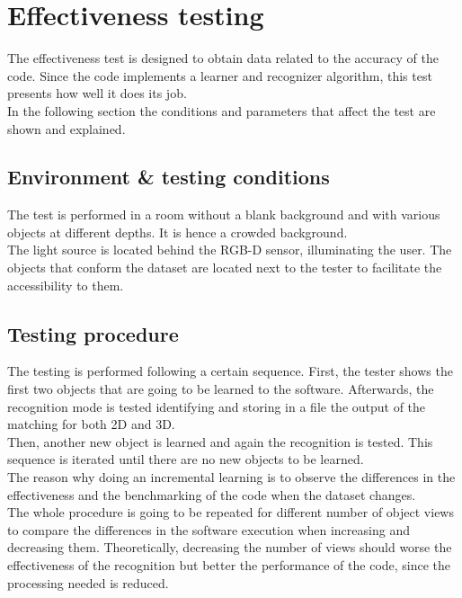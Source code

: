 \chapter{Effectiveness testing}

	The effectiveness test is designed to obtain data related to the accuracy of the code. Since the code implements a learner and recognizer algorithm, this test presents how well it does its job. 
\\

	In the following section the conditions and parameters that affect the test are shown and explained. 

	\section{Environment \& testing conditions}
		The test is performed in a room without a blank background and with various objects at different depths. It is hence a crowded background. 
		\\

		The light source is located behind the RGB-D sensor, illuminating the user. The objects that conform the dataset are located next to the tester to facilitate the accessibility to them. 

	\section{Testing procedure}
		The testing is performed following a certain sequence. First, the tester shows the first two objects that are going to be learned to the software. Afterwards, the recognition mode is tested identifying and storing in a file the output of the matching for both 2D and 3D. 
		\\

		Then, another new object is learned and again the recognition is tested. This sequence is iterated until there are no new objects to be learned. 
		\\

		The reason why doing an incremental learning is to observe the differences in the effectiveness and the benchmarking of the code when the dataset changes. 
		\\

		The whole procedure is going to be repeated for different number of object views to compare the differences in the software execution when increasing and decreasing them. Theoretically, decreasing the number of views should worse the effectiveness of the recognition but better the performance of the code, since the processing needed is reduced.

